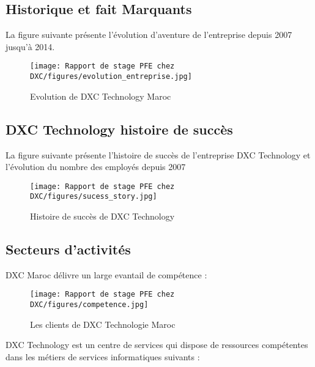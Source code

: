 \newpage

\subsection{Historique et fait Marquants }

La figure suivante présente l’évolution d’aventure de l’entreprise depuis 2007 jusqu’à 2014.

\begin{figure}[!h]
    \centering
    \texttt{[image: Rapport de stage PFE chez DXC/figures/evolution\_entreprise.jpg]}
    \caption{Evolution de DXC Technology Maroc}
\end{figure}

\newpage
\subsection{DXC Technology histoire de succès }

La figure suivante présente l’histoire de succès de l’entreprise DXC Technology et l’évolution du nombre des employés depuis 2007

\begin{figure}[!h]
    \centering
    \texttt{[image: Rapport de stage PFE chez DXC/figures/sucess\_story.jpg]}
    \caption{Histoire de succès de DXC Technology}
\end{figure}

\subsection{Secteurs d’activités}

DXC Maroc délivre un large evantail de compétence :

\begin{figure}[!h]
    \centering
    \texttt{[image: Rapport de stage PFE chez DXC/figures/competence.jpg]}
    \caption{Les clients de DXC Technologie Maroc}
\end{figure}

\newpage
DXC Technology est un centre de services qui dispose de ressources compétentes dans les
métiers de services informatiques suivants :

